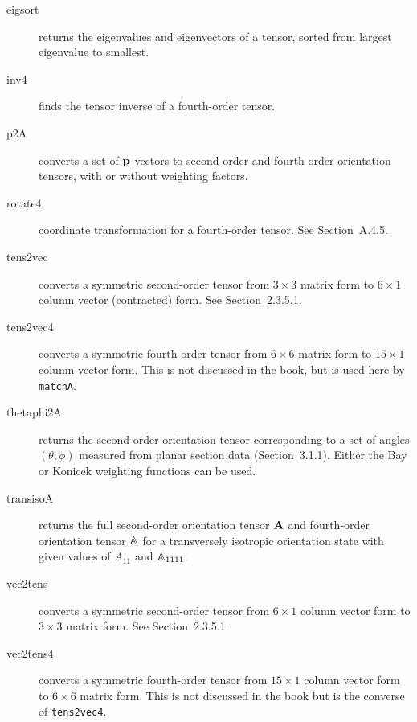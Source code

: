 \documentclass[11pt]{article}
\begin{document}
\begin{description}

    \item[eigsort]{returns the eigenvalues and eigenvectors of a tensor, sorted from largest eigenvalue to smallest.}

    \item[inv4]{finds the tensor inverse of a fourth-order tensor.}

    \item[p2A]{converts a set of $\mathbf{p}$ vectors to second-order and fourth-order orientation tensors, with or without weighting factors.}

    \item[rotate4]{coordinate transformation for a fourth-order tensor.  See Section~A.4.5.}

    \item[tens2vec]{converts a symmetric second-order tensor from $3 \times 3$ matrix form to $6 \times 1$ column vector (contracted) form.  See Section~2.3.5.1.}

    \item[tens2vec4]{converts a symmetric fourth-order tensor from $6 \times 6$ matrix form to $15 \times 1$ column vector form.  This is not discussed in the book, but is used here by \texttt{matchA}.}

    \item[thetaphi2A]{returns the second-order orientation tensor corresponding to a set of angles $(\theta, \phi)$ measured from planar section data (Section~3.1.1).  Either the Bay or Konicek weighting functions can be used.}

    \item[transisoA]{returns the full second-order orientation tensor $\mathbf{A}$ and fourth-order orientation tensor $\mathbb{A}$ for a transversely isotropic orientation state with given values of $A_{11}$ and $\mathbb{A}_{1111}$.}

    \item[vec2tens]{converts a symmetric second-order tensor from $6 \times 1$ column vector form to $3 \times 3$ matrix form.  See Section~2.3.5.1.}

    \item[vec2tens4]{converts a symmetric fourth-order tensor from $15 \times 1$ column vector form to $6 \times 6$ matrix form.  This is not discussed in the book but is the converse of \texttt{tens2vec4}.}
    
\end{description}
\end{document}
